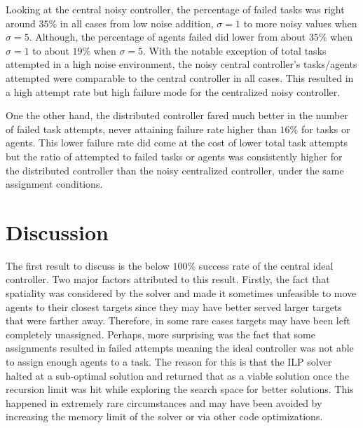 \documentclass[12pt]{book}
\begin{document}
Looking at the central noisy controller, the percentage of failed tasks was right around $35\%$ in all cases from low noise addition, $\sigma = 1$ to more noisy values when $\sigma = 5$. Although, the percentage of agents failed did lower from about $35\%$ when $\sigma = 1$ to about $19\%$ when $\sigma = 5$. With the notable exception of total tasks attempted in a high noise environment, the noisy central controller's tasks/agents attempted were comparable to the central controller in all cases. This resulted in a high attempt rate but high failure mode for the centralized noisy controller.

One the other hand, the distributed controller fared much better in the number of failed task attempts, never attaining failure rate higher than $16\%$ for tasks or agents. This lower failure rate did come at the cost of lower total task attempts but the ratio of attempted to failed tasks or agents was consistently higher for the distributed controller than the noisy centralized controller, under the same assignment conditions.

\section{Discussion}
The first result to discuss is the below $100\%$ success rate of the central ideal controller. Two major factors attributed to this result. Firstly, the fact that spatiality was considered by the solver and made it sometimes unfeasible to move agents to their closest targets since they may have better served larger targets that were farther away. Therefore, in some rare cases targets may have been left completely unassigned. Perhaps, more surprising was the fact that some assignments resulted in failed attempts meaning the ideal controller was not able to assign enough agents to a task. The reason for this is that the ILP solver halted at a sub-optimal solution and returned that as a viable solution once the recursion limit was hit while exploring the search space for better solutions. This happened in extremely rare circumstances and may have been avoided by increasing the memory limit of the solver or via other code optimizations.
\end{document}
